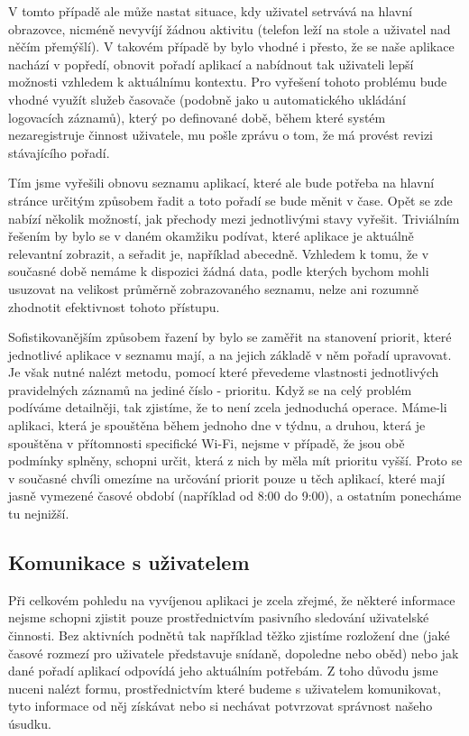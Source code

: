 \documentclass[thesis=M,czech]{FITthesis}[2012/06/26]
\begin{document}
V tomto případě ale může nastat situace, kdy uživatel setrvává na hlavní obrazovce, nicméně nevyvíjí žádnou aktivitu (telefon leží na stole a uživatel nad něčím přemýšlí). V takovém případě by bylo vhodné i přesto, že se naše aplikace nachází v popředí, obnovit pořadí aplikací a nabídnout tak uživateli lepší možnosti vzhledem k aktuálnímu kontextu. Pro vyřešení tohoto problému bude vhodné využít služeb časovače (podobně jako u automatického ukládání logovacích záznamů), který po definované době, během které systém nezaregistruje činnost uživatele, mu pošle zprávu o tom, že má provést revizi stávajícího pořadí.

Tím jsme vyřešili obnovu seznamu aplikací, které ale bude potřeba na hlavní stránce určitým způsobem řadit a toto pořadí se bude měnit v čase. Opět se zde nabízí několik možností, jak přechody mezi jednotlivými stavy vyřešit. Triviálním řešením by bylo se v daném okamžiku podívat, které aplikace je aktuálně relevantní zobrazit, a seřadit je, například abecedně. Vzhledem k tomu, že v současné době nemáme k dispozici žádná data, podle kterých bychom mohli usuzovat na velikost průměrně zobrazovaného seznamu, nelze ani rozumně zhodnotit efektivnost tohoto přístupu.

Sofistikovanějším způsobem řazení by bylo se zaměřit na stanovení priorit, které jednotlivé aplikace v seznamu mají, a na jejich základě v něm pořadí upravovat. Je však nutné nalézt metodu, pomocí které převedeme vlastnosti jednotlivých pravidelných záznamů na jediné číslo - prioritu. Když se na celý problém podíváme detailněji, tak zjistíme, že to není zcela jednoduchá operace. Máme-li aplikaci, která je spouštěna během jednoho dne v týdnu, a druhou, která je spouštěna v přítomnosti specifické Wi-Fi, nejsme v případě, že jsou obě podmínky splněny, schopni určit, která z nich by měla mít prioritu vyšší. Proto se v současné chvíli omezíme na určování priorit pouze u těch aplikací, které mají jasně vymezené časové období (například od 8:00 do 9:00), a ostatním ponecháme tu nejnižší.

\subsection{Komunikace s uživatelem}\label{communication}
Při celkovém pohledu na vyvíjenou aplikaci je zcela zřejmé, že některé informace nejsme schopni zjistit pouze prostřednictvím pasivního sledování uživatelské činnosti. Bez aktivních podnětů tak například těžko zjistíme rozložení dne (jaké časové rozmezí pro uživatele představuje snídaně, dopoledne nebo oběd) nebo jak dané pořadí aplikací odpovídá jeho aktuálním potřebám. Z toho důvodu jsme nuceni nalézt formu, prostřednictvím které budeme s uživatelem komunikovat, tyto informace od něj získávat nebo si nechávat potvrzovat správnost našeho úsudku.
\end{document}
